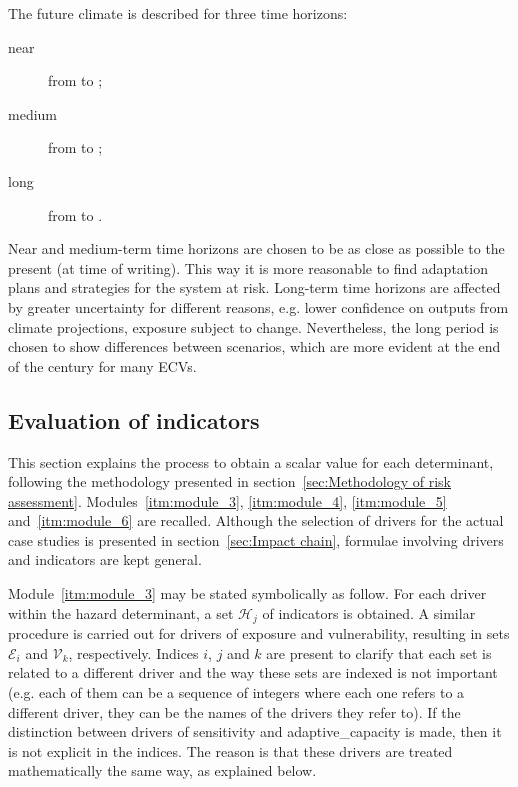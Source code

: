 The future climate is described for three time horizons:
\begin{description}
  \item[near] from  to ;
  \item[medium] from  to ;
  \item[long] from  to .
\end{description}
Near and medium-term time horizons are chosen to be as close as possible to the present (at time of writing). This way it is more reasonable to find adaptation plans and strategies for the system at risk.
Long-term time horizons are affected by greater uncertainty for different reasons, e.g. lower confidence on outputs from climate projections, exposure subject to change. Nevertheless, the long period is chosen to show differences between scenarios, which are more evident at the end of the century for many \glspl{ECV}.



\subsection{Evaluation of indicators}
\label{sec:Evaluation of indicators}
This section explains the process to obtain a scalar value for each \gls{determinant}, following the methodology presented in section~\ref{sec:Methodology of risk assessment}. Modules~\ref{itm:module_3}, \ref{itm:module_4}, \ref{itm:module_5} and~\ref{itm:module_6} are recalled.
Although the selection of \glspl{driver} for the actual case studies is presented in section~\ref{sec:Impact chain}, formulae involving \glspl{driver} and \glspl{indicator} are kept general.

Module~\ref{itm:module_3} may be stated symbolically as follow. For each \gls{driver} within the \gls{hazard} \gls{determinant}, a set $\mathcal{H}_j$ of \glspl{indicator} is obtained. A similar procedure is carried out for \glspl{driver} of \gls{exposure} and \gls{vulnerability}, resulting in sets $\mathcal{E}_i$ and $\mathcal{V}_k$, respectively. Indices $i$, $j$ and $k$ are present to clarify that each set is related to a different \gls{driver} and the way these sets are indexed is not important (e.g. each of them can be a sequence of integers where each one refers to a different \gls{driver}, they can be the names of the \glspl{driver} they refer to).
If the distinction between \glspl{driver} of \gls{sensitivity} and \gls{adaptive_capacity} is made, then it is not explicit in the indices. The reason is that these \glspl{driver} are treated mathematically the same way, as explained below.

